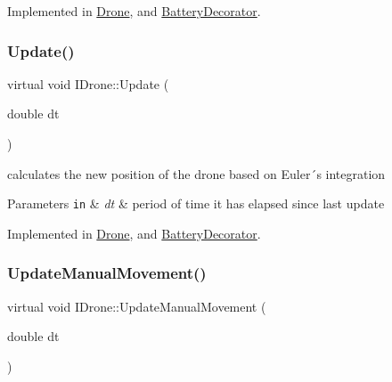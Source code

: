 Implemented in \hyperlink{classDrone_a3c8e1ccbff90c7b5192679317f219061}{Drone}, and \hyperlink{classBatteryDecorator_abf7e2a2b4634330de27e7072236ffc5f}{Battery\+Decorator}.

\mbox{\label{classIDrone_a6d840d60cda9a985b94af42ef54520b7}} 
\subsubsection{\texorpdfstring{Update()}{Update()}}
{\footnotesize\ttfamily virtual void I\+Drone\+::\+Update (\begin{DoxyParamCaption}\item[{double}]{dt }\end{DoxyParamCaption})\hspace{0.3cm}{\ttfamily [pure virtual]}}



calculates the new position of the drone based on Euler´s integration 


\begin{DoxyParams}[1]{Parameters}
\mbox{\tt in}  & {\em dt} & period of time it has elapsed since last update \\
\hline
\end{DoxyParams}


Implemented in \hyperlink{classDrone_abc6b79ccc7fdbc3bec8d539fc836c04d}{Drone}, and \hyperlink{classBatteryDecorator_a92ea38b63e41d61d7392cb58a53fa8d9}{Battery\+Decorator}.

\mbox{\label{classIDrone_a82486b4192f6ccf8b3d93fbb9101f2dd}} 
\subsubsection{\texorpdfstring{Update\+Manual\+Movement()}{UpdateManualMovement()}}
{\footnotesize\ttfamily virtual void I\+Drone\+::\+Update\+Manual\+Movement (\begin{DoxyParamCaption}\item[{double}]{dt }\end{DoxyParamCaption})\hspace{0.3cm}{\ttfamily [pure virtual]}}



